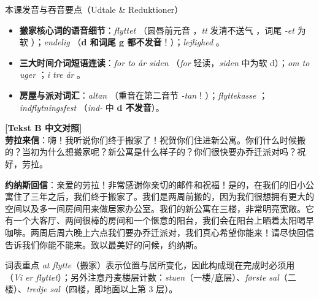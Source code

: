 \begin{tipbox}{本课发音与吞音要点（Udtale \& Reduktioner）}
\begin{itemize}
  \item \textbf{搬家核心词的语音细节}：\textit{flyttet} （圆唇前元音 ，\textit{tt} 发清不送气 ，词尾 \textit{-et} 为软 ）；\textit{endelig} （\textbf{d 和词尾 g 都不发音}！）；\textit{lejlighed} 。
  \item \textbf{三大时间介词短语连读}：\textit{for to år siden} （\textit{for} 轻读，\textit{siden} 中为软 d）；\textit{om to uger} ；\textit{i tre år} 。
  \item \textbf{房屋与派对词汇}：\textit{altan} （重音在第二音节 \textit{-tan}！）；\textit{flyttekasse} ；\textit{indflytningsfest} （\textit{ind-} 中 \textbf{d 不发音}）。
\end{itemize}
\end{tipbox}

\begin{transbox}
\small
\textbf{\color{NCDTeal}[Tekst B 中文对照]}\\
\textbf{劳拉来信}：嗨！我听说你们终于搬家了！祝贺你们住进新公寓。你们什么时候搬的？当初为什么想搬家呢？新公寓是什么样子的？你们很快要办乔迁派对吗？祝好，劳拉。

\textbf{约纳斯回信}：亲爱的劳拉！非常感谢你亲切的邮件和祝福！是的，在我们的旧小公寓住了三年之后，我们终于搬家了。我们是两周前搬的，因为我们很想拥有更大的空间以及多一间房间用来做居家办公室。我们的新公寓在三楼，非常明亮宽敞。它有一个大客厅、两间很棒的房间和一个惬意的阳台，我们会在阳台上晒着太阳喝早咖啡。两周后周六晚上六点我们要办乔迁派对，我们真心希望你能来！请尽快回信告诉我们你能不能来。致以最美好的问候，约纳斯。
\end{transbox}


\begin{tipbox}{词表重点}
\textit{at flytte}（搬家）表示位置与居所变化，因此构成现在完成时必须用 （\textit{Vi er flyttet}）；另外注意丹麦楼层计数：\textit{stuen}（一楼/底层）、\textit{første sal}（二楼）、\textit{tredje sal}（四楼，即地面以上第 3 层）。
\end{tipbox}

